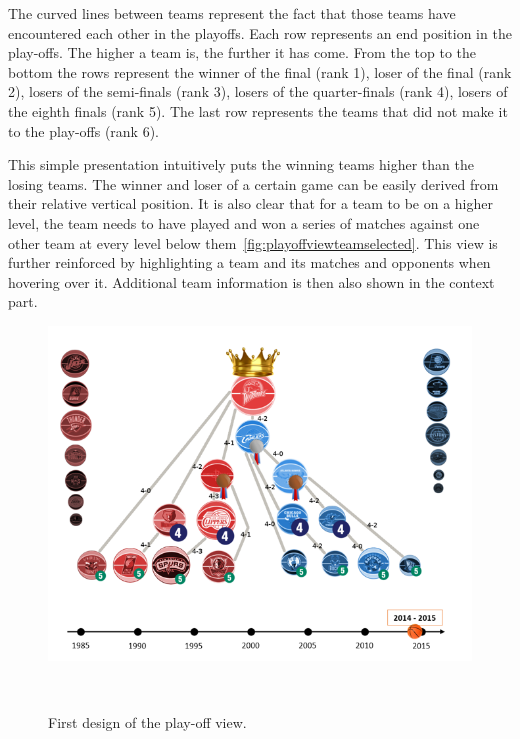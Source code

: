 \documentclass[]{sigchi}
\begin{document}
The curved lines between teams represent the fact that those teams have 
encountered each other in the playoffs. Each row represents an end position 
in the play-offs. The higher a team is, the further it has come.  From the 
top to the bottom the rows represent the winner of the final (rank 1), loser 
of the final (rank 2), losers of the semi-finals (rank 3), losers of the 
quarter-finals (rank 4), losers of the eighth finals (rank 5). The last row 
represents the teams that did not make it to the play-offs (rank 6). 

This simple presentation intuitively puts the winning teams higher than the
losing teams. The winner and loser of a certain game can be easily derived from 
their relative vertical position. It is also clear that for a team to be on a 
higher level, the team needs to have played and won a series of matches against 
one other team at every level below them~\ref{fig:playoffviewteamselected}. 
This view is further reinforced by highlighting a team and its matches and 
opponents when hovering over it. Additional team information is then also shown 
in the context part.


\begin{figure}
\centering
  \includegraphics[width=1.0\columnwidth]{figures/playoffviewfirstdesign}
  \caption{First design of the play-off view.}~\label{fig:firstdesignplayoffview}
\end{figure}
\end{document}
